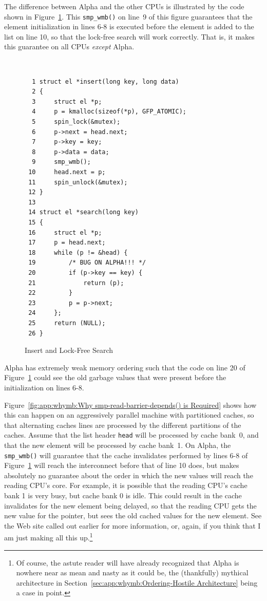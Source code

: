The difference between Alpha and the other CPUs is illustrated by the
code shown in
Figure~\ref{fig:app:whymb:Insert and Lock-Free Search}.
This {\tt smp\_wmb()} on line~9 of this figure
guarantees that the element initialization
in lines 6-8 is executed before the element is added to the
list on line 10, so that the lock-free search will work correctly.
That is, it makes this guarantee on all CPUs {\em except} Alpha.

\begin{figure}
{\tt \scriptsize
\begin{verbatim}
  1 struct el *insert(long key, long data)
  2 {
  3     struct el *p;
  4     p = kmalloc(sizeof(*p), GFP_ATOMIC);
  5     spin_lock(&mutex);
  6     p->next = head.next;
  7     p->key = key;
  8     p->data = data;
  9     smp_wmb();
 10     head.next = p;
 11     spin_unlock(&mutex);
 12 }
 13
 14 struct el *search(long key)
 15 {
 16     struct el *p;
 17     p = head.next;
 18     while (p != &head) {
 19         /* BUG ON ALPHA!!! */
 20         if (p->key == key) {
 21             return (p);
 22         }
 23         p = p->next;
 24     };
 25     return (NULL);
 26 }
\end{verbatim}
}
\caption{Insert and Lock-Free Search}
\label{fig:app:whymb:Insert and Lock-Free Search}
\end{figure}

Alpha has extremely weak memory ordering
such that the code on line 20 of
Figure~\ref{fig:app:whymb:Insert and Lock-Free Search} could see the old
garbage values that were present before the initialization on lines 6-8.

Figure~\ref{fig:app:whymb:Why smp-read-barrier-depends() is Required}
shows how this can happen on
an aggressively parallel machine with partitioned caches, so that
alternating caches lines are processed by the different partitions
of the caches.
Assume that the list header {\tt head} will be processed by cache bank~0,
and that the new element will be processed by cache bank~1.
On Alpha, the {\tt smp\_wmb()} will guarantee that the cache invalidates performed
by lines 6-8 of
Figure~\ref{fig:app:whymb:Insert and Lock-Free Search} will reach
the interconnect before that of line 10 does, but
makes absolutely no guarantee about the order in which the new values will
reach the reading CPU's core.
For example, it is possible that the reading CPU's cache bank 1 is very
busy, but cache bank 0 is idle.
This could result in the cache invalidates for the new element being
delayed, so that the reading CPU gets the new value for the pointer,
but sees the old cached values for the new element.
See the Web site called out earlier for more information,
or, again, if you think that I am just making all this up.\footnote{
	Of course, the astute reader will have already recognized that
	Alpha is nowhere near as mean and nasty as it could be,
	the (thankfully) mythical architecture in
	Section~\ref{sec:app:whymb:Ordering-Hostile Architecture}
	being a case in point.}

